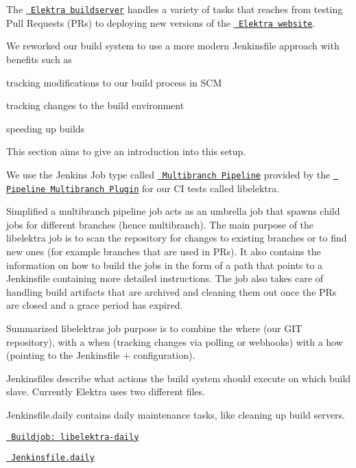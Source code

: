 The \href{https://build.libelektra.org/}{\texttt{ Elektra buildserver}} handles a variety of tasks that reaches from testing Pull Requests (P\+Rs) to deploying new versions of the \href{https://www.libelektra.org}{\texttt{ Elektra website}}.

We reworked our build system to use a more modern Jenkinsfile approach with benefits such as


\begin{DoxyItemize}
\item tracking modifications to our build process in S\+CM
\item tracking changes to the build environment
\item speeding up builds
\end{DoxyItemize}

This section aims to give an introduction into this setup.

We use the Jenkins Job type called \href{https://jenkins.io/doc/book/pipeline/multibranch/\#creating-a-multibranch-pipeline}{\texttt{ Multibranch Pipeline}} provided by the \href{https://wiki.jenkins.io/display/JENKINS/Pipeline+Multibranch+Plugin}{\texttt{ Pipeline Multibranch Plugin}} for our CI tests called {\ttfamily libelektra}.

Simplified a multibranch pipeline job acts as an umbrella job that spawns child jobs for different branches (hence multibranch). The main purpose of the libelektra job is to scan the repository for changes to existing branches or to find new ones (for example branches that are used in PR\textquotesingle{}s). It also contains the information on how to build the jobs in the form of a path that points to a Jenkinsfile containing more detailed instructions. The job also takes care of handling build artifacts that are archived and cleaning them out once the PR\textquotesingle{}s are closed and a grace period has expired.

Summarized libelektra\textquotesingle{}s job purpose is to combine the where (our G\+IT repository), with a when (tracking changes via polling or webhooks) with a how (pointing to the Jenkinsfile + configuration).

Jenkinsfiles describe what actions the build system should execute on which build slave. Currently Elektra uses two different files.


\begin{DoxyItemize}
\item Jenkinsfile.daily contains daily maintenance tasks, like cleaning up build servers.
\item \href{https://build.libelektra.org/job/libelektra-daily/}{\texttt{ Buildjob\+: libelektra-\/daily}}
\item \href{https://master.libelektra.org/scripts/jenkins/Jenkinsfile.daily}{\texttt{ Jenkinsfile.\+daily}}
\end{DoxyItemize}



